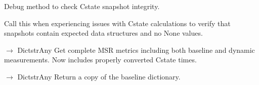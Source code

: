 \documentclass[letterpaper,10pt,english]{sphinxmanual}
\begin{document}
\begin{fulllineitems}
\begin{fulllineitems}
\end{fulllineitems}


\begin{fulllineitems}
\label{\detokenize{core.readers.msr_reader:core.readers.msr_reader.MSRReader.debug_cstate_snapshots}}
\pysigstartsignatures
\pysiglinewithargsret
{}
{}
{}
\pysigstopsignatures
\sphinxAtStartPar
Debug method to check C\sphinxhyphen{}state snapshot integrity.

\sphinxAtStartPar
Call this when experiencing issues with C\sphinxhyphen{}state calculations to verify
that snapshots contain expected data structures and no None values.

\end{fulllineitems}


\begin{fulllineitems}
\label{\detokenize{core.readers.msr_reader:core.readers.msr_reader.MSRReader.get_all_metrics}}
\pysigstartsignatures
\pysiglinewithargsret
{}
{}
{{ $\rightarrow$ Dict\DUrole{p}{{[}}strAny\DUrole{p}{{]}}}}
\pysigstopsignatures
\sphinxAtStartPar
Get complete MSR metrics including both baseline and dynamic measurements.
Now includes properly converted C\sphinxhyphen{}state times.

\end{fulllineitems}


\begin{fulllineitems}
\label{\detokenize{core.readers.msr_reader:core.readers.msr_reader.MSRReader.get_baseline_dict}}
\pysigstartsignatures
\pysiglinewithargsret
{}
{}
{{ $\rightarrow$ Dict\DUrole{p}{{[}}strAny\DUrole{p}{{]}}}}
\pysigstopsignatures
\sphinxAtStartPar
Return a copy of the baseline dictionary.


\end{fulllineitems}
\end{fulllineitems}
\end{document}
